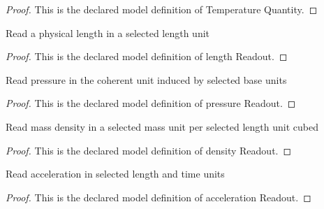\begin{proof}
  This is the declared model definition of Temperature Quantity.
\end{proof}
\begin{definition}
  \label{def:physics:phyx-mini-0382:phyxminiproblems-problemphyxmini0382-lengthreadout}
  Read a physical length in a selected length unit
\end{definition}
\begin{proof}
  This is the declared model definition of length Readout.
\end{proof}
\begin{definition}
  \label{def:physics:phyx-mini-0382:phyxminiproblems-problemphyxmini0382-pressurereadout}
  Read pressure in the coherent unit induced by selected base units
\end{definition}
\begin{proof}
  This is the declared model definition of pressure Readout.
\end{proof}
\begin{definition}
  \label{def:physics:phyx-mini-0382:phyxminiproblems-problemphyxmini0382-densityreadout}
  Read mass density in a selected mass unit per selected length unit cubed
\end{definition}
\begin{proof}
  This is the declared model definition of density Readout.
\end{proof}
\begin{definition}
  \label{def:physics:phyx-mini-0382:phyxminiproblems-problemphyxmini0382-accelerationreadout}
  Read acceleration in selected length and time units
\end{definition}
\begin{proof}
  This is the declared model definition of acceleration Readout.
\end{proof}

